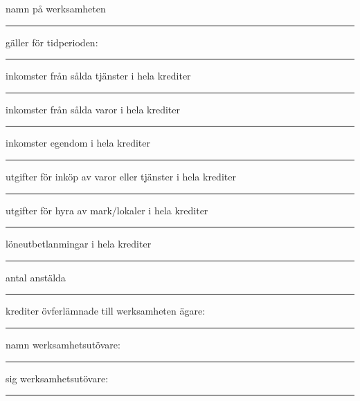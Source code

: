 \documentclass{letter}
\begin{document}
namn på werksamheten
\vspace*{1cm}
\hrule
gäller för tidperioden:
\vspace*{1cm}
\hrule

inkomster från sålda tjänster i hela krediter
\vspace*{1cm}
\hrule
inkomster från sålda varor i hela krediter
\vspace*{1cm}
\hrule
inkomster egendom i hela krediter
\vspace*{1cm}
\hrule
utgifter för inköp av varor eller tjänster i hela krediter
\vspace*{1cm}
\hrule
utgifter för hyra av mark/lokaler i hela krediter
\vspace*{1cm}
\hrule
löneutbetlanmingar i hela krediter
\vspace*{1cm}
\hrule
antal anstälda
\vspace*{1cm}
\hrule


\normalsize

\vfill
krediter övferlämnade till werksamheten ägare:
\vspace*{1cm}
\hrule
namn werksamhetsutövare:
\vspace*{1cm}
\hrule
sig werksamhetsutövare:
\vspace*{1cm}
\hrule
\end{document}
